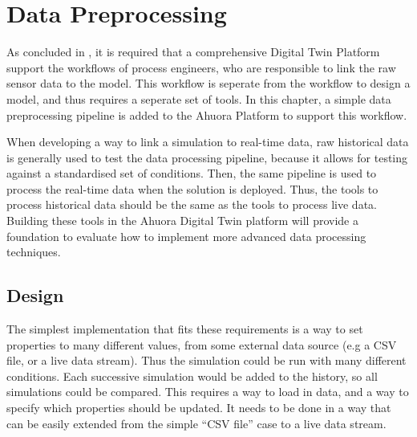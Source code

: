 


\section{Data Preprocessing} \label{sec:datapreprocessing}



As concluded in , it is required that a comprehensive Digital Twin Platform support the workflows of process engineers, who are responsible to link the raw sensor data to the model. This workflow is seperate from the workflow to design a model, and thus requires a seperate set of tools. 
In this chapter, a simple data preprocessing pipeline is added to the Ahuora Platform to support this workflow. 

When developing a way to link a simulation to real-time data, raw historical data is generally used to test the data processing pipeline, because it allows for testing against a standardised set of conditions. Then, the same pipeline is used to process the real-time data when the solution is deployed.
Thus, the tools to process historical data should be the same as the tools to process live data. 
Building these tools in the Ahuora Digital Twin platform will provide a foundation to evaluate how to implement more advanced data processing techniques.

\subsection{Design}

The simplest implementation that fits these requirements is a way to set properties to many different values, from some external data source (e.g a CSV file, or a live data stream). Thus the simulation could be run with many different conditions. Each successive simulation would be added to the history, so all simulations could be compared.
This requires a way to load in data, and a way to specify which properties should be updated. It needs to be done in a way that can be easily extended from the simple ``CSV file'' case to a live data stream.


